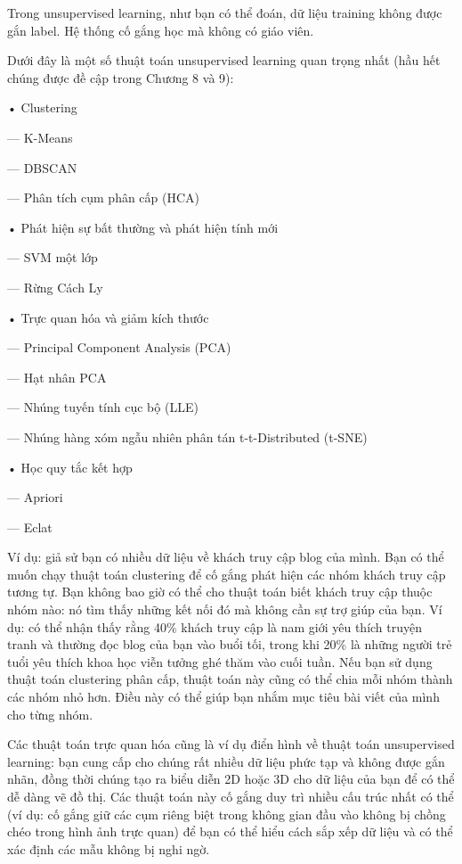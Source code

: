 Trong unsupervised learning, như bạn có thể đoán, dữ liệu training không được gắn label. Hệ thống cố gắng học mà không có giáo viên.

Dưới đây là một số thuật toán unsupervised learning quan trọng nhất (hầu hết chúng được đề cập trong Chương 8 và 9):

• Clustering

— K-Means

— DBSCAN

— Phân tích cụm phân cấp (HCA)

• Phát hiện sự bất thường và phát hiện tính mới

— SVM một lớp

— Rừng Cách Ly

• Trực quan hóa và giảm kích thước

— Principal Component Analysis (PCA)

— Hạt nhân PCA

— Nhúng tuyến tính cục bộ (LLE)

— Nhúng hàng xóm ngẫu nhiên phân tán t-t-Distributed (t-SNE)

• Học quy tắc kết hợp

— Apriori

— Eclat

Ví dụ: giả sử bạn có nhiều dữ liệu về khách truy cập blog của mình. Bạn có thể muốn chạy thuật toán clustering để cố gắng phát hiện các nhóm khách truy cập tương tự. Bạn không bao giờ có thể cho thuật toán biết khách truy cập thuộc nhóm nào: nó tìm thấy những kết nối đó mà không cần sự trợ giúp của bạn. Ví dụ: có thể nhận thấy rằng 40\% khách truy cập là nam giới yêu thích truyện tranh và thường đọc blog của bạn vào buổi tối, trong khi 20\% là những người trẻ tuổi yêu thích khoa học viễn tưởng ghé thăm vào cuối tuần. Nếu bạn sử dụng thuật toán clustering phân cấp, thuật toán này cũng có thể chia mỗi nhóm thành các nhóm nhỏ hơn. Điều này có thể giúp bạn nhắm mục tiêu bài viết của mình cho từng nhóm.

Các thuật toán trực quan hóa cũng là ví dụ điển hình về thuật toán unsupervised learning: bạn cung cấp cho chúng rất nhiều dữ liệu phức tạp và không được gắn nhãn, đồng thời chúng tạo ra biểu diễn 2D hoặc 3D cho dữ liệu của bạn để có thể dễ dàng vẽ đồ thị. Các thuật toán này cố gắng duy trì nhiều cấu trúc nhất có thể (ví dụ: cố gắng giữ các cụm riêng biệt trong không gian đầu vào không bị chồng chéo trong hình ảnh trực quan) để bạn có thể hiểu cách sắp xếp dữ liệu và có thể xác định các mẫu không bị nghi ngờ.

